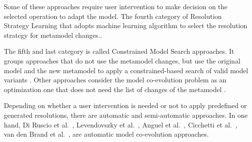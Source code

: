  
  Some of these approaches require user intervention to make decision on the selected operation to adapt the model.
  The fourth category of Resolution Strategy Learning that adopts machine learning algorithm to select the resolution strategy for metamodel changes.\cite{anguel2013towards}.%
 
The fifth and last category is called Constrained Model Search approaches. It groups approaches that do not use the metamodel changes, but use the original model and the new metamodel to apply a constrained-based search of valid model variants \cite{demuth2016co,gomez2014approach,schonbock2014care}. Other approaches consider the model co-evolution problem as an optimization one that does not need the list of changes of the metamodel \cite{kessentini2016automated,kessentini2019automated,kessentini2020interactive}.




Depending on whether a user intervention is needed or not to apply predefined or generated resolutions, there are automatic and semi-automatic approaches.
In one hand, Di Ruscio et al.~\cite{10.1007/978-3-642-33654-62}, Levendovszky et al.~\cite{levendovszky2014semi}, Anguel et al.~\cite{anguel2013towards,anguel2014using}, Cicchetti et al.~\cite{cicchetti2008automating}, van den Brand et al.~\cite{van2011generic}, are automatic model co-evolution approaches.

